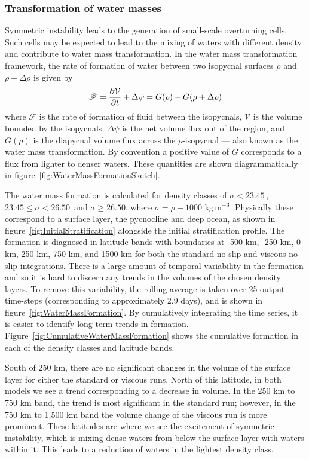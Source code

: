     \subsubsection{Transformation of water masses}
    \label{subsubsec:WaterMassTransformation}
    Symmetric instability leads to the generation of small-scale overturning cells. Such cells may be expected to lead to the mixing of waters with different density and contribute to water mass transformation. In the \citet{Walin1982} water mass transformation framework, the rate of formation of water between two isopycnal surfaces $\rho$ and $\rho + \Delta \rho$ is given by
    \begin{equation}
        \mathscr{F} = \pdv{\mathcal{V}}{t} + \Delta \psi = G(\rho) - G(\rho + \Delta \rho)
        \label{eq:WallinFormation}
    \end{equation}
    where $\mathscr{F}$ is the rate of formation of fluid between the isopycnals, $\mathcal{V}$ is the volume bounded by the isopycnals, $\Delta \psi$ is the net volume flux out of the region, and $G(\rho)$ is the diapycnal volume flux across the $\rho$-isopycnal --- also known as the water mass transformation. By convention a positive value of $G$ corresponds to a flux from lighter to denser waters. These quantities are shown diagrammatically in figure~\ref{fig:WaterMassFormationSketch}.

    The water mass formation is calculated for density classes of $\sigma < 23.45$\,,~$23.45 \leq \sigma < 26.50$~and $\sigma \geq 26.50$, where $\sigma = \rho - 1000$ kg\,m$^{-3}$. Physically these correspond to a surface layer, the pycnocline and deep ocean, as shown in figure~\ref{fig:InitialStratification} alongside the initial stratification profile. The formation is diagnosed in latitude bands with boundaries at -500 km, -250 km, 0 km, 250 km, 750 km, and 1500 km for both the standard no-slip  and viscous no-slip integrations. There is a large amount of temporal variability in the formation and so it is hard to discern any trends in the volumes of the chosen density layers. To remove this variability, the rolling average is taken over 25 output time-steps (corresponding to approximately 2.9 days), and is shown in figure~\ref{fig:WaterMassFormation}. By cumulatively integrating the time series, it is easier to identify long term trends in formation. Figure~\ref{fig:CumulativeWaterMassFormation} shows the cumulative formation in each of the density classes and latitude bands.

    South of 250 km, there are no significant changes in the volume of the surface layer for either the standard or viscous runs. North of this latitude, in both models we see a trend corresponding to a decrease in volume. In the 250 km to 750 km band, the trend is most significant in the standard run; however, in the 750 km to 1,500 km band the volume change of the viscous run is more prominent. These latitudes are where we see the excitement of symmetric instability, which is mixing dense waters from below the surface layer with waters within it. This leads to a reduction of waters in the lightest density class.
    
